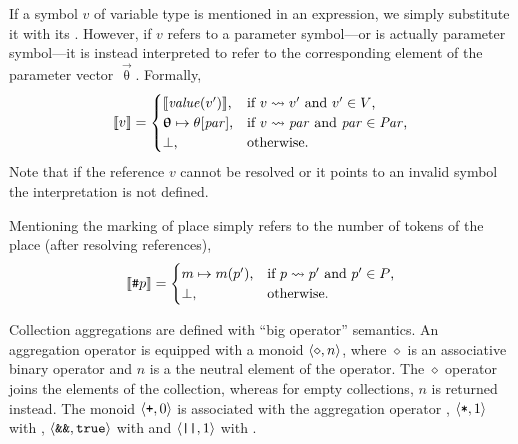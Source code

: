 If a symbol \(v\) of variable type is mentioned in an expression, we simply substitute it with its . However, if \(v\) refers to a parameter symbol---or is actually parameter symbol---it is instead interpreted to refer to the corresponding element of the parameter vector \(\vec{\uptheta}\). Formally,
\begin{equation}
  \llbracket v \rrbracket = \begin{cases}
    \llbracket \textrm{\itshape value\/}(v') \rrbracket \text, & \text{if \(v \leadsto v'\) and \(v' \in V\),} \\
    \bm{\mathrm{\uptheta}} \mapsto \theta[\textrm{\itshape par\/}] \text, & \text{if \(v \leadsto \textrm{\itshape par\/}\) and \(\textrm{\itshape par\/} \in \textrm{\itshape Par\/}\),} \\
    {\perp} \text, & \text{otherwise.}
  \end{cases}
\end{equation}
Note that if the reference \(v\) cannot be resolved or it points to an invalid symbol the interpretation is not defined.

Mentioning the marking of place simply refers to the number of tokens of the place (after resolving references),
\begin{equation}
  \llbracket \texttt{\upshape \#} p \rrbracket = \begin{cases}
    m \mapsto m(p')\text, & \text{if \(p \leadsto p'\) and \(p' \in P\),} \\
    {\perp} \text, & \text{otherwise.}
  \end{cases}
\end{equation}

Collection aggregations are defined with \enquote{big operator} semantics. An aggregation operator is equipped with a monoid \(\langle \diamond, n \rangle\), where \(\diamond\) is an associative binary operator and \(n\) is a the neutral element of the operator. The \(\diamond\) operator joins the elements of the collection, whereas for empty collections, \(n\) is returned instead. The monoid \(\langle \texttt{\upshape +}, 0\rangle\) is associated with the aggregation operator , \(\langle \texttt{\upshape *}, 1\rangle\) with , \(\langle \texttt{\upshape \&\&}, \texttt{\upshape true}\rangle\) with  and \(\langle \texttt{\upshape ||}, 1\rangle\) with .

